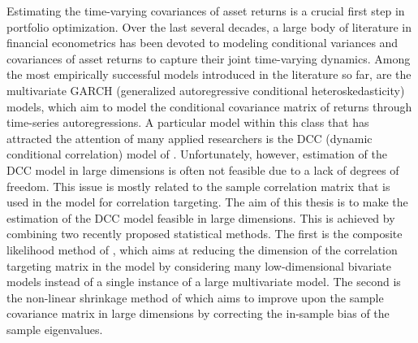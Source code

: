 Estimating the time-varying covariances of asset returns is a crucial first step in portfolio optimization. Over the last several decades, a large body of literature in financial econometrics has been devoted to modeling conditional variances and covariances of asset returns to capture their joint time-varying dynamics. Among the most empirically successful models introduced in the literature so far, are the multivariate GARCH (generalized autoregressive conditional heteroskedasticity) models, which aim to model the conditional covariance matrix of returns through time-series autoregressions. A particular model within this class that has attracted the attention of many applied researchers is the DCC (dynamic conditional correlation) model of \textcite{ENGLE2002}. Unfortunately, however, estimation of the DCC model in large dimensions is often not feasible due to a lack of degrees of freedom. This issue is mostly related to the sample correlation matrix that is used in the model for correlation targeting. The aim of this thesis is to make the estimation of the DCC model feasible in large dimensions. This is achieved by combining two recently proposed statistical methods. The first is the composite likelihood method of \textcite{PAKELETAL}, which aims at reducing the dimension of the correlation targeting matrix in the model by considering many low-dimensional bivariate models instead of a single instance of a large multivariate model. The second is the non-linear shrinkage method of \textcite{LEDOITWOLF2012} which aims to improve upon the sample covariance matrix in large dimensions by correcting the in-sample bias of the sample eigenvalues.

